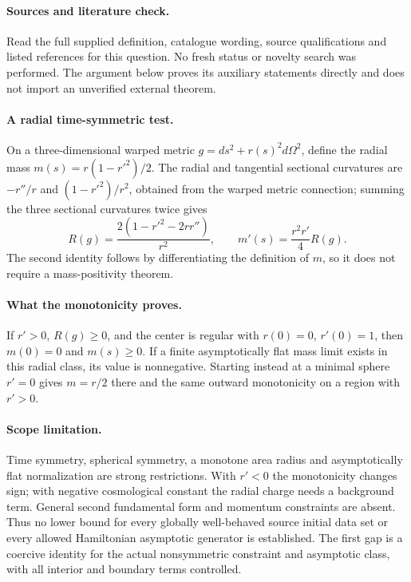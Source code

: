 \documentclass[11pt]{article}
\begin{document}
\paragraph{Sources and literature check.}
Read the full supplied definition, catalogue wording, source qualifications and listed references for this question. No fresh status or novelty search was performed. The argument below proves its auxiliary statements directly and does not import an unverified external theorem.

\paragraph{A radial time-symmetric test.} On a three-dimensional warped metric \(g=ds^2+r(s)^2d\Omega^2\), define the radial mass \(m(s)=r(1-r'^2)/2\). The radial and tangential sectional curvatures are \(-r''/r\) and \((1-r'^2)/r^2\), obtained from the warped metric connection; summing the three sectional curvatures twice gives
\[
 R(g)=\frac{2(1-r'^2-2rr'')}{r^2},\qquad
 m'(s)=\frac{r^2r'}4R(g).
\]
The second identity follows by differentiating the definition of \(m\), so it does not require a mass-positivity theorem.
\paragraph{What the monotonicity proves.} If \(r'>0\), \(R(g)\geq0\), and the center is regular with \(r(0)=0\), \(r'(0)=1\), then \(m(0)=0\) and \(m(s)\geq0\). If a finite asymptotically flat mass limit exists in this radial class, its value is nonnegative. Starting instead at a minimal sphere \(r'=0\) gives \(m=r/2\) there and the same outward monotonicity on a region with \(r'>0\).
\paragraph{Scope limitation.} Time symmetry, spherical symmetry, a monotone area radius and asymptotically flat normalization are strong restrictions. With \(r'<0\) the monotonicity changes sign; with negative cosmological constant the radial charge needs a background term. General second fundamental form and momentum constraints are absent. Thus no lower bound for every globally well-behaved source initial data set or every allowed Hamiltonian asymptotic generator is established. The first gap is a coercive identity for the actual nonsymmetric constraint and asymptotic class, with all interior and boundary terms controlled.
\end{document}
